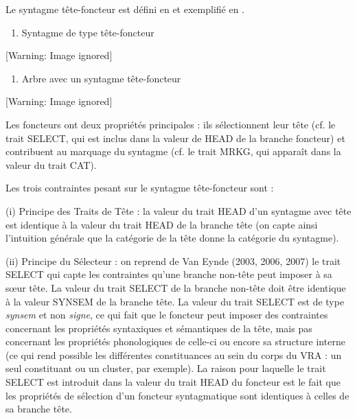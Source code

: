 Le syntagme tête-foncteur est défini en  et exemplifié en .


\begin{enumerate}
\item \label{bkm:Ref299023339}Syntagme de type tête-foncteur  


\end{enumerate}
  [Warning: Image ignored] %
 


\begin{enumerate}
\item \label{bkm:Ref299023342}Arbre avec un syntagme tête-foncteur  


\end{enumerate}
{   [Warning: Image ignored] %
} 

Les foncteurs ont deux propriétés principales : ils sélectionnent leur tête (cf. le trait SELECT, qui est inclus dans la valeur de HEAD de la branche foncteur) et contribuent au marquage du syntagme (cf. le trait MRKG, qui apparaît dans la valeur du trait CAT). 

Les trois contraintes pesant sur le syntagme tête-foncteur sont :

(i) Principe des Traits de Tête : la valeur du trait HEAD d'un syntagme avec tête est identique à la valeur du trait HEAD de la branche tête (on capte ainsi l'intuition générale que la catégorie de la tête donne la catégorie du syntagme). 

(ii) Principe du Sélecteur : on reprend de Van Eynde (2003, 2006, 2007) le trait SELECT qui capte les contraintes qu'une branche non-tête peut imposer à sa s{\oe}ur tête. La valeur du trait SELECT de la branche non-tête doit être identique à la valeur SYNSEM de la branche tête. La valeur du trait SELECT est de type \textit{synsem} et non \textit{signe}, ce qui fait que le foncteur peut imposer des contraintes concernant les propriétés syntaxiques et sémantiques de la tête, mais pas concernant les propriétés phonologiques de celle-ci ou encore sa structure interne (ce qui rend possible les différentes constituances au sein du corps du VRA : un seul constituant ou un cluster, par exemple). La raison pour laquelle le trait SELECT est introduit dans la valeur du trait HEAD du foncteur est le fait que les propriétés de sélection d'un foncteur syntagmatique sont identiques à celles de sa branche tête.

